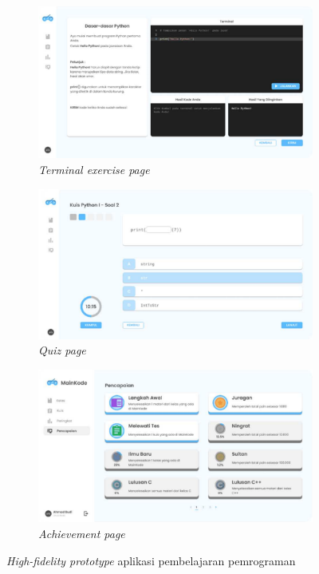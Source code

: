\begin{figure}[htbp]
\begin{subfigure}[b]{0.4\textwidth}
	  \label{fig:sub2-a2}
	\end{subfigure}
	\hfill
	\begin{subfigure}[b]{0.4\textwidth}
		\centering
		\includegraphics[width=\linewidth]{contents/chapter-2/images/Evan-a3.png}
		\caption{\textit{Terminal exercise page}}
		\label{fig:sub3-a3}
	\end{subfigure}  
	\begin{subfigure}[b]{0.4\textwidth}
		\centering
		\includegraphics[width=\linewidth]{contents/chapter-2/images/Evan-a4.png}
		\caption{\textit{Quiz page}}
		\label{fig:sub4-a4}
	\end{subfigure} 
	\begin{subfigure}[b]{0.4\textwidth}
		\centering
		\includegraphics[width=\linewidth]{contents/chapter-2/images/Evan-a5.png}
		\caption{\textit{Achievement page}}
		\label{fig:sub5-a5}
	\end{subfigure} 
	\caption{\textit{High-fidelity prototype} aplikasi pembelajaran pemrograman}
	\label{fig:High-fidelity prototype Evan}
  \end{figure}
